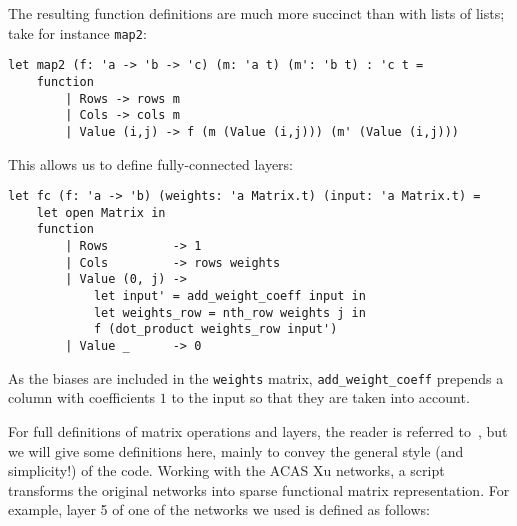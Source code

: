 \documentclass[runningheads]{llncs}
\newcommand{\knote}[1]{\todo[inline, color=blue!20]{#1}}
\begin{document}
The resulting function definitions are much more succinct than with lists of lists; take for instance \lstinline{map2}:

\begin{lstlisting}[language=caml]
let map2 (f: 'a -> 'b -> 'c) (m: 'a t) (m': 'b t) : 'c t =
	function
		| Rows -> rows m
		| Cols -> cols m
		| Value (i,j) -> f (m (Value (i,j))) (m' (Value (i,j)))
\end{lstlisting}

\noindent This allows us to define fully-connected layers:

\begin{lstlisting}[language=caml]
let fc (f: 'a -> 'b) (weights: 'a Matrix.t) (input: 'a Matrix.t) = 
	let open Matrix in
	function
		| Rows         -> 1
		| Cols         -> rows weights
		| Value (0, j) -> 
			let input' = add_weight_coeff input in
			let weights_row = nth_row weights j in
			f (dot_product weights_row input')
		| Value _      -> 0
\end{lstlisting}

\noindent As the biases are included in the \lstinline|weights| matrix, \lstinline|add_weight_coeff| prepends a column with coefficients $1$ to the input so that they are taken into account.

\iffalse
-----------------------

\noindent The only help Imandra needs to prove this automatically -- are the forward-chaining rules about the $relu$ function:


\begin{lstlisting}[language=caml]
	lemma relu_pos x =
	x >= 0 ==> (relu x) [@trigger] = x
	[@@auto] [@@fc]
	
	lemma relu_neg x =
	x <= 0 ==> (relu x) [@trigger] = 0
	[@@auto] [@@fc]
\end{lstlisting}

\noindent And then we disable $relu$ for all of the proofs. This way,
$relu$ induces no simplification case-splits, while all
relevant information about $relu$ values is propagated,
per instance, on demand to our simplification context.
Now Imandra's engine takes care of the proof automatically  (when we use the tactic \lstinline{[@@auto]}), and takes just under 1.5 minutes.
\knote{explain better how auto works}
----------------------
\fi


For full definitions of matrix operations and layers, the reader is referred to~\cite{DPKD22}, but we will give some definitions here, mainly to convey the general style (and simplicity!) of the code.  Working with the ACAS Xu networks, a script transforms the original networks into sparse functional matrix representation.
For example, layer 5 of one of the networks we used is defined as follows:
\end{document}
